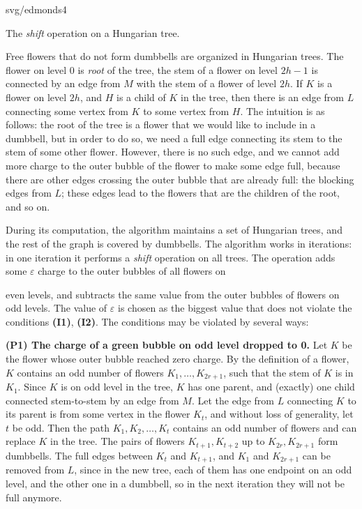 \noindent
\begin{minipage}[t]{0.45\textwidth}
  \vskip 0pt
\begin{myfig}{\textwidth}{svg/edmonds4}
  \centerline{ The {\em shift} operation on a Hungarian tree.}
\end{myfig}
\end{minipage}
\hfill
\begin{minipage}[t]{0.5\textwidth}
  \vskip 0pt

\noindent
Free flowers that do not form dumbbells are organized in Hungarian trees. The flower on level 0 is {\em root} 
of the tree, the stem of a flower on level $2h-1$ is connected by an edge from $M$ with the stem of a flower
of level $2h$. If $K$ is a flower on level $2h$, and $H$ is a child of $K$ in the tree, then there is
an edge from $L$ connecting some vertex from $K$ to some vertex from $H$. The intuition is as follows:
the root of the tree is a flower that we would like to include in a dumbbell, but in order to do so, we
need a full edge connecting its stem to the stem of some other flower. However, there is no such edge, and
we cannot add more charge to the outer bubble of the flower to make some edge full, because there are other
edges crossing the outer bubble that are already full: the blocking edges from $L$; these edges lead to 
the flowers that are the children of the root, and so on. 

\noindent
During its computation, the algorithm maintains a set
of Hungarian trees, and the rest of the graph is covered by dumbbells. The algorithm 
works in iterations: in one iteration it performs a {\em shift} operation on all trees. The operation
adds some $\varepsilon$ charge to the outer bubbles of all flowers on 
\end{minipage}

\noindent
even levels, and subtracts the
same value from the outer bubbles of flowers on odd levels. The value of $\varepsilon$ is chosen as the
biggest value that does not violate the conditions {\bf (I1)}, {\bf (I2)}. The conditions may 
be violated by several ways:

\noindent
{\bf (P1) The charge of a green bubble on odd level dropped to 0. }
Let $K$ be the flower whose outer bubble reached zero charge. By the definition of a flower, $K$
contains an odd number of flowers $K_1,\ldots,K_{2r+1}$, such that the stem of $K$ is in  $K_1$.
Since $K$ is on odd level in the tree, $K$ has one parent, and (exactly) one child connected
stem-to-stem by an edge from $M$. Let the edge from $L$ connecting $K$ to its parent is from some
vertex in the flower $K_t$, and without loss of generality, let $t$ be odd. Then the
path $K_1,K_2,\ldots,K_t$ contains an odd number of flowers and can replace $K$ in the tree.
The pairs of flowers $K_{t+1},K_{t+2}$ up to $K_{2r},K_{2r+1}$ form dumbbells. The full edges
between $K_t$ and  $K_{t+1}$, and $K_1$ and $K_{2r+1}$ can be removed from $L$, since in the 
new tree, each of them has one endpoint on an odd level, and the other one in a dumbbell, so in the
next iteration they will not be full anymore. 

